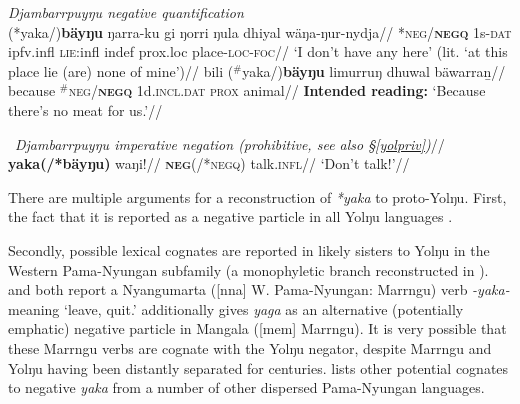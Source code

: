 \documentclass[usenames,dvipsnames,11pt]{article}
\begin{document}
{{\pex{} \textit{Djambarrpuyŋu negative quantification}\\
\a\begingl
	\gla (*yaka/)\textbf{bäyŋu} ŋarra-ku gi ŋorri ŋula dhiyal wäŋa-ŋur-nydja//
	\glb \textsc{*neg/\textbf{negq}} 1\gls{s}\textsc{-dat} \gls{ipfv}.\gls{infl} \textsc{lie}:\gls{infl} \gls{indef} \gls{prox}.\gls{loc} place-\textsc{loc-foc}//
	\glft`I don't have any here' (lit. `at this place lie (are) none of mine')\hfill\citep[691]{Wilkinson1991}//
	\endgl
\a\begingl\gla bili ($^\#$yaka/)\textbf{bäyŋu} limurruŋ dhuwal bäwarraṉ//
\glb because \textsc{$^\#$neg/\textbf{negq}} 1\gls{d}.\textsc{incl.dat} \textsc{prox} animal//
\glft\textbf{Intended reading:} `Because there's no meat for us.'//\endgl
\xe

\pex~\begingl\glpreamble\textit{Djambarrpuyŋu imperative negation (prohibitive, see also §\ref{yolpriv})}//
\gla \textbf{yaka(/*bäyŋu)} waŋi!//
\glb \textsc{\textbf{neg}(/*negq)} talk.\textsc{infl}//
\glft`Don't talk!'//\endgl\xe


There are multiple arguments for a reconstruction of \textit{*yaka} to proto-Yolŋu. First, the fact that it is reported as a negative particle in all Yolŋu languages \citep[31]{Schebeck2001}.

 Secondly, possible lexical cognates are reported in likely sisters to Yolŋu in the Western Pama-Nyungan subfamily (a monophyletic branch reconstructed in \citealt[838]{Bowern2012}). \citet[226]{Sharp2004} and \citet[67]{Ogrady1963} both report a Nyangumarta ([\gls{nna}] W. Pama-Nyungan: Marrngu) verb \textit{-yaka-} meaning `leave, quit.' \citet[35]{Mckelson1974} additionally gives \textit{yaga} as an alternative (potentially emphatic) negative particle in Mangala ([\gls{mem}] Marrngu). It is very possible that these Marrngu verbs are cognate with the Yolŋu negator, despite Marrngu and Yolŋu having been distantly separated for centuries. \citet[85]{Dixon2002a} lists other potential cognates to negative \textit{yaka} from a number of other dispersed Pama-Nyungan languages.
 
}}
\end{document}
